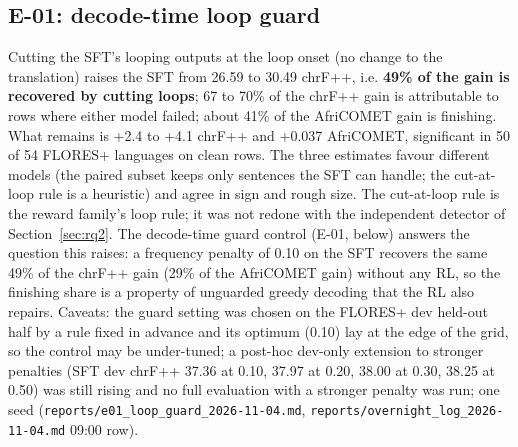 
















\subsection*{E-01: decode-time loop guard}









 Cutting the SFT's looping outputs at the loop onset (no change to the translation) raises the SFT from 26.59 to 30.49 chrF++, i.e. \textbf{49\% of the gain is recovered by cutting loops}; 67 to 70\% of the chrF++ gain is attributable to rows where either model failed; about 41\% of the AfriCOMET gain is finishing. What remains is +2.4 to +4.1 chrF++ and +0.037 AfriCOMET, significant in 50 of 54 FLORES+ languages on clean rows. The three estimates favour different models (the paired subset keeps only sentences the SFT can handle; the cut-at-loop rule is a heuristic) and agree in sign and rough size. The cut-at-loop rule is the reward family's loop rule; it was not redone with the independent detector of Section~\ref{sec:rq2}. The decode-time guard control (E-01, below) answers the question this raises: a frequency penalty of 0.10 on the SFT recovers the same 49\% of the chrF++ gain (29\% of the AfriCOMET gain) without any RL, so the finishing share is a property of unguarded greedy decoding that the RL also repairs. Caveats: the guard setting was chosen on the FLORES+ dev held-out half by a rule fixed in advance and its optimum (0.10) lay at the edge of the grid, so the control may be under-tuned; a post-hoc dev-only extension to stronger penalties (SFT dev chrF++ 37.36 at 0.10, 37.97 at 0.20, 38.00 at 0.30, 38.25 at 0.50) was still rising and no full evaluation with a stronger penalty was run; one seed (\texttt{reports/\allowbreak{}e01\_\allowbreak{}loop\_\allowbreak{}guard\_\allowbreak{}2026-\allowbreak{}11-\allowbreak{}04.\allowbreak{}md}, \texttt{reports/\allowbreak{}overnight\_\allowbreak{}log\_\allowbreak{}2026-\allowbreak{}11-\allowbreak{}04.\allowbreak{}md} 09:00 row).

